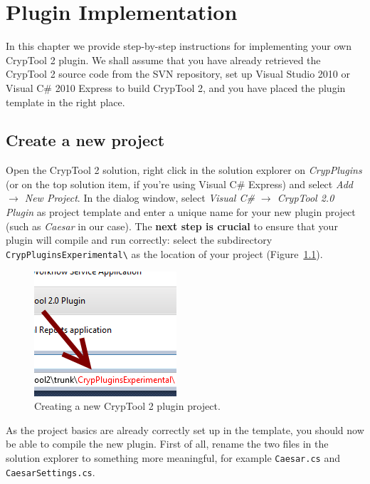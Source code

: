 \chapter{Plugin Implementation}
\label{sec:PluginImplementation}
In this chapter we provide step-by-step instructions for implementing your own CrypTool 2 plugin. We shall assume that you have already retrieved the CrypTool 2 source code from the SVN repository, set up Visual Studio 2010 or Visual C\# 2010 Express to build CrypTool 2, and you have placed the plugin template in the right place.

\section{Create a new project}
\label{sec:CreatingANewProject}

Open the CrypTool 2 solution, right click in the solution explorer on \textit{CrypPlugins} (or on the top solution item, if you're using Visual C\# Express) and select \textit{Add~$\rightarrow$ New Project}. In the dialog window, select \textit{Visual C\# $\rightarrow$ CrypTool 2.0 Plugin} as project template and enter a unique name for your new plugin project (such as \textit{Caesar} in our case). The \textbf{next step is crucial} to ensure that your plugin will compile and run correctly: select the subdirectory \texttt{CrypPluginsExperimental\textbackslash} as the location of your project (Figure~\ref{fig:vs_create_new_project}).

\begin{figure}[h!]
	\centering
		\includegraphics{figures/vs_create_new_project.png}
	\caption{Creating a new CrypTool 2 plugin project.}
	\label{fig:vs_create_new_project}
\end{figure}

As the project basics are already correctly set up in the template, you should now be able to compile the new plugin. First of all, rename the two files in the solution explorer to something more meaningful, for example \texttt{Caesar.cs} and \texttt{CaesarSettings.cs}.

